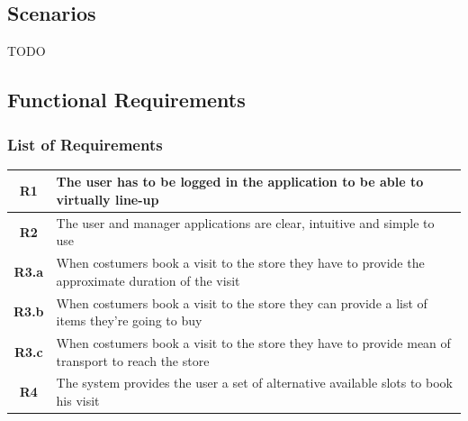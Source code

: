 \documentclass[]{article}
\begin{document}
		\subsection{Scenarios}
		
		TODO
		
		\newpage
		
		\subsection{Functional Requirements}
			
			\subsubsection{List of Requirements}
				\begin{tabular}{|c|l|}
				\hline
				\textbf{R1} & 
					\begin{minipage}[t]{13cm}
						The user has to be logged in the application to be able to virtually line-up
					\end{minipage}
				\\ \hline
				\textbf{R2} & 					
					\begin{minipage}[t]{13cm}
						The user and manager applications are clear, intuitive and simple to use
					\end{minipage}
				\\ \hline
				\textbf{R3.a} &
					\begin{minipage}[t]{13cm}
						When costumers book a visit to the store they have to provide the approximate duration of the visit 
					\end{minipage}
				\\ \hline				
				\textbf{R3.b} & 
					\begin{minipage}[t]{13cm}
						When costumers book a visit to the store they can provide a list of items they're going to buy
					\end{minipage}
				\\ \hline				
				\textbf{R3.c} & 
					\begin{minipage}[t]{13cm}
						When costumers book a visit to the store they have to provide mean of transport to reach the store
					\end{minipage}
				\\ \hline				
				\textbf{R4} & 
					\begin{minipage}[t]{13cm}
						The system provides the user a set of alternative available slots to book his visit
					\end{minipage}

\end{tabular}
\end{document}
